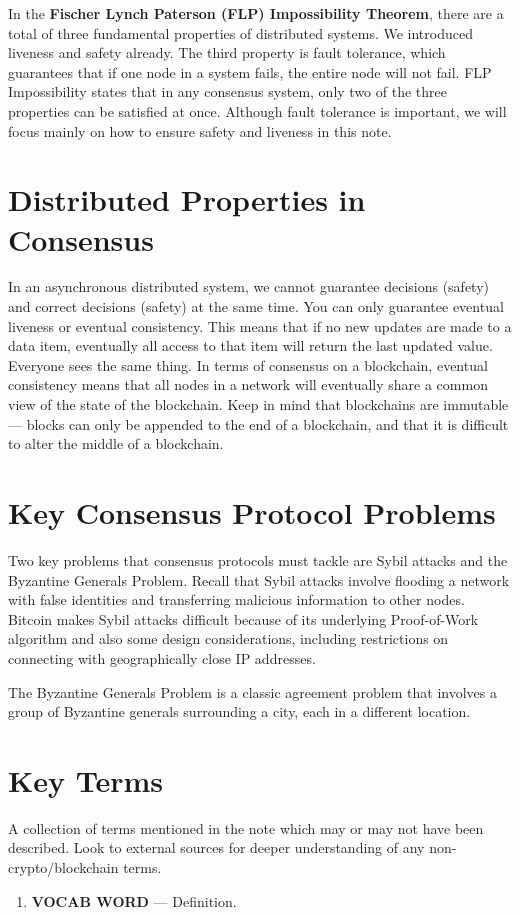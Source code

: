 \documentclass[full.tex]{subfiles}
\begin{document}
    In the \textbf{Fischer Lynch Paterson (FLP) Impossibility Theorem}, there are a total of three fundamental properties of distributed systems. We introduced liveness and safety already. The third property is fault tolerance, which guarantees that if one node in a system fails, the entire node will not fail. FLP Impossibility states that in any consensus system, only two of the three properties can be satisfied at once. Although fault tolerance is important, we will focus mainly on how to ensure safety and liveness in this note.
    
    \section*{Distributed Properties in Consensus}
    
    In an asynchronous distributed system, we cannot guarantee decisions (safety) and correct decisions (safety) at the same time. You can only guarantee eventual liveness or eventual consistency. This means that if no new updates are made to a data item, eventually all access to that item will return the last updated value. Everyone sees the same thing. In terms of consensus on a blockchain, eventual consistency means that all nodes in a network will eventually share a common view of the state of the blockchain. Keep in mind that blockchains are immutable --- blocks can only be appended to the end of a blockchain, and that it is difficult to alter the middle of a blockchain. 
    
    \section*{Key Consensus Protocol Problems}
    
    Two key problems that consensus protocols must tackle are Sybil attacks and the Byzantine Generals Problem. Recall that Sybil attacks involve flooding a network with false identities and transferring malicious information to other nodes. Bitcoin makes Sybil attacks difficult because of its underlying Proof-of-Work algorithm and also some design considerations, including restrictions on connecting with geographically close IP addresses.
    
    The Byzantine Generals Problem is a classic agreement problem that involves a group of Byzantine generals surrounding a city, each in a different location. 
    
    
    
    
    \newpage
    \thispagestyle{firstpage}
    \vspace*{2\baselineskip}
    \section*{Key Terms}
    \noindent A collection of terms mentioned in the note which may or may not have been described. Look to external sources for deeper understanding of any non-crypto/blockchain terms.
    \begin{enumerate}
        \item \textbf{VOCAB WORD} --- Definition. %
    \end{enumerate}
\end{document}
